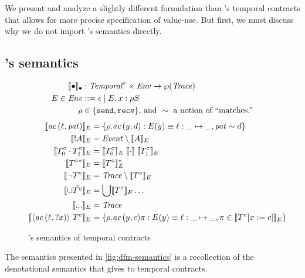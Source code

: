 We present and analyze a slightly different formulation than \dfm's temporal contracts that allows for more precise specification of value-use.
%
But first, we must discuss why we do not import \dfm's semantics directly.
%
\subsection{\dfm's semantics}
\newcommand{\denotedfm}[2]{\denote{#1}_{#2}}
\begin{figure}
\setlength{\abovedisplayskip}{0pt}
\setlength{\belowdisplayskip}{4pt}
\setlength{\abovedisplayshortskip}{0pt}
\setlength{\belowdisplayshortskip}{8pt}
  \begin{align*}
    \denotedfm{\bullet}{\bullet} &: \TContract^\circ \times \Env \to \wp(\mathit{Trace})
    \\
    E \in \Env &::= \epsilon \alt E, \mvar : \rho \mscon
    \\
    \rho &\in \setof{{\tt send}, {\tt recv}} \text{, and }\sim \text{ a notion of ``matches.''}
  \end{align*}
  \begin{align*}
    \denotedfm{\scevdfm{\mtoplevelname}{\mvpat}}{E} &=
      \setbuild{\rho.\scevdfm{y}{d}}{E(y) \equiv \sarr{\mtoplevelname}{\_}{\_}, \mvpat \sim d}
    \\
    \denotedfm{\snonevent{\mevent}}{E} &= \Event \setminus \denotedfm{\mevent}{E}
    \\
    \denotedfm{\stseq{\motcon_0}{\motcon_1}}{E} &= \denotedfm{\motcon_0}{E} \semseq \denotedfm{\motcon_1}{E}
    \\
    \denotedfm{\stmany{\motcon{}}}{E} &= \stmany{\denotedfm{\motcon}{E}}
    \\
    \denotedfm{\stnot{\motcon}}{E} &= \mathit{Trace} \setminus \denotedfm{\motcon}{E}
    \\
    \denotedfm{\stOr{\isset{\motcon}}}{E} &= \bigcup\denotedfm{\motcon}{E}\ldots
    \\
    \denotedfm{\sddd}{E} &= \mathit{Trace}
    \\
    \denotedfm{\stbind{\scevdfm{\mtoplevelname}{? \mvar}}{\motcon}}{E} &= \setbuild{\rho.\scevdfm{y}{c}\mtrace}{E(y) \equiv \sarr{\mtoplevelname}{\_}{\_}, \mtrace \in \denotedfm{\motcon[\mvar := c]}{E}}
  \end{align*}
  \caption{\dfm's semantics of temporal contracts}
  \label{fig:dfm-semantics}
\end{figure}
%
The semantics presented in \autoref{fig:dfm-semantics} is a recollection of the denotational semantics that \dfm{} gives to temporal contracts.
